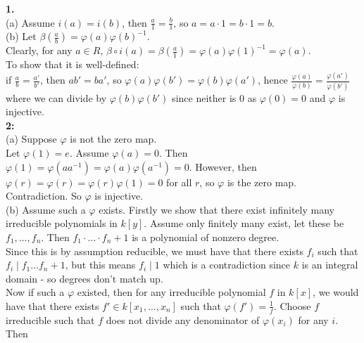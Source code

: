 \documentclass[a4paper]{article}
\begin{document}
    \textbf{1.} \\
    (a) Assume $i (a) = i(b)$, then $\frac{a}{1} = \frac{b}{1}$, so
    $a = a \cdot 1 = b\cdot 1 = b$.\\
    \linebreak
    (b) Let $\beta \left( \frac{a}{b} \right) = 
    \varphi(a) \varphi(b)^{-1}$.\\
    \linebreak
    Clearly, for any $a \in R$,
    $\beta \circ i (a) = \beta\left( \frac{a}{1} \right) 
    = \varphi (a) \varphi(1)^{-1} = \varphi(a)$.\\
    To show that it is well-defined:\\
    if $\frac{a}{b}= \frac{a'}{b'}$, then $ab' = ba'$, so
    $\varphi(a) \varphi(b') = \varphi(b) \varphi(a')$, hence
    $\frac{\varphi (a)}{\varphi(b)} = \frac{\varphi(a')}{\varphi(b')}$ where
    we can divide by $\varphi(b)\varphi(b')$ since
    neither is $0$ as $\varphi(0) = 0$ and $\varphi$ is injective.\\
    \linebreak
    \textbf{2:} \\
    (a) Suppose $\varphi$ is not the zero map.\\
    Let $\varphi(1) = e$. Assume $\varphi(a) = 0$. Then
    $\varphi(1) = \varphi(a a^{-1}) = \varphi(a) \varphi(a^{-1}) = 0$. However,
    then
    $\varphi(r) = \varphi(r) = \varphi (r) \varphi(1) = 0$ for all
    $r$, so $\varphi$ is the zero map. Contradiction. So $\varphi$ is
    injective.\\
    \linebreak
    (b) Assume such a $\varphi$ exists. Firstly we show that there
    exist infinitely many irreducible polynomials in $k\left[ y \right] $.
    Assume only finitely many exist, let these be $f_1, \ldots, f_n$. Then
    $f_1 \cdot \ldots \cdot f_n + 1$ is a polynomial of nonzero degree.\\
    Since this is by assumption reducible, we must have that there
    exists $f_i$ such that $f_i  \mid f_1 \ldots f_n + 1$, but this means
    $f_i  \mid 1$ which is a contradiction since $k$ is an integral domain - so
    degrees don't match up.\\
    \linebreak
    Now if such a $\varphi$ existed, then for any irreducible polynomial
    $f$ in $k\left[ x \right] $, we would have that there exists
    $f' \in k\left[ x_1, \ldots, x_n \right] $ such that
    $\varphi(f') = \frac{1}{f}$. Choose $f$ irreducible such that
    $f$ does not divide any denominator of $\varphi(x_i)$ for any $i$. Then
\end{document}
